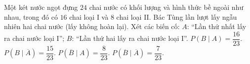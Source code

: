\begin{ex}
Một két nước ngọt đựng $24$ chai nước có khối lượng và hình thức bề ngoài như nhau, trong đó có $16$ chai loại I và $8$ chai loại II. Bác Tùng lần lượt lấy ngẫu nhiên hai chai nước (lấy không hoàn lại). Xét các biến cố: $A$: ``Lần thứ nhất lấy ra chai nước loại I''; $B$: ``Lần thứ hai lấy ra chai nước loại I''.
\choiceTF
{$P(B\mid A)=\dfrac{16}{23}$.}
{$P(B\mid\overline{A})=\dfrac{15}{23}$.}
{\True $P(\overline{B}\mid A)=\dfrac{8}{23}$.}
{\True $P(\overline{B}\mid\overline{A})=\dfrac{7}{23}$.}
\end{ex}
